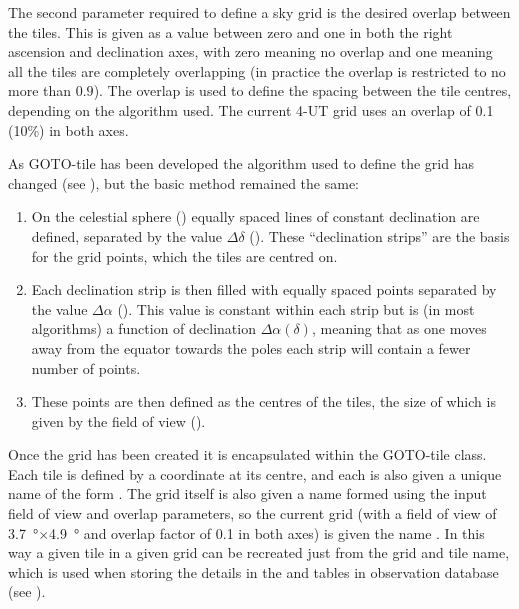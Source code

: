 \begin{colsection}
\begin{colsection}
The second parameter required to define a sky grid is the desired overlap between the tiles. This is given as a value between zero and one in both the right ascension and declination axes, with zero meaning no overlap and one meaning all the tiles are completely overlapping (in practice the overlap is restricted to no more than $0.9$). The overlap is used to define the spacing between the tile centres, depending on the algorithm used. The current 4-UT grid uses an overlap of 0.1 (10\%) in both axes.

As GOTO-tile has been developed the algorithm used to define the grid has changed (see ), but the basic method remained the same:

\begin{enumerate}
    \item On the celestial sphere () equally spaced lines of constant declination are defined, separated by the value $\Delta\delta$ (). These ``declination strips'' are the basis for the grid points, which the tiles are centred on.
    \item Each declination strip is then filled with equally spaced points separated by the value $\Delta\alpha$ (). This value is constant within each strip but is (in most algorithms) a function of declination $\Delta\alpha(\delta)$, meaning that as one moves away from the equator towards the poles each strip will contain a fewer number of points.
    \item These points are then defined as the centres of the tiles, the size of which is given by the field of view ().
\end{enumerate}

Once the grid has been created it is encapsulated within the GOTO-tile  class. Each tile is defined by a coordinate at its centre, and each is also given a unique name of the form . The grid itself is also given a name formed using the input field of view and overlap parameters, so the current  grid (with a field of view of \SI{3.7}{\degree}$\times$\SI{4.9}{\degree} and overlap factor of 0.1 in both axes) is given the name . In this way a given tile in a given grid can be recreated just from the grid and tile name, which is used when storing the details in the  and  tables in observation database (see ). %

\newpage


\end{colsection}
\end{colsection}
